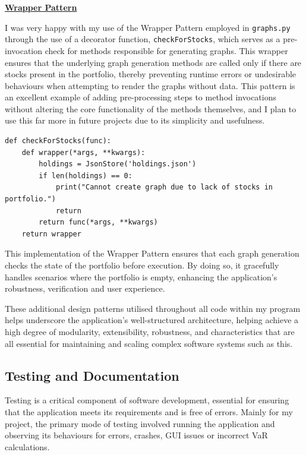 \documentclass{article}
\begin{document}
\underline{\textbf{Wrapper Pattern}}\\\vspace{0.3cm}

I was very happy with my use of the Wrapper Pattern employed in \texttt{graphs.py} through the use of a decorator function, \texttt{checkForStocks}, which serves as a pre-invocation check for methods responsible for generating graphs. This wrapper ensures that the underlying graph generation methods are called only if there are stocks present in the portfolio, thereby preventing runtime errors or undesirable behaviours when attempting to render the graphs without data. This pattern is an excellent example of adding pre-processing steps to method invocations without altering the core functionality of the methods themselves, and I plan to use this far more in future projects due to its simplicity and usefulness.\\\vspace{0.3cm}

\begin{verbatim}
def checkForStocks(func):
    def wrapper(*args, **kwargs):
        holdings = JsonStore('holdings.json')
        if len(holdings) == 0:
            print("Cannot create graph due to lack of stocks in portfolio.")
            return
        return func(*args, **kwargs)
    return wrapper
\end{verbatim}

\vspace{0.3cm}
This implementation of the Wrapper Pattern ensures that each graph generation checks the state of the portfolio before execution. By doing so, it gracefully handles scenarios where the portfolio is empty, enhancing the application's robustness, verification and user experience.\\\vspace{0.3cm}

These additional design patterns utilised throughout all code within my program helps underscore the application's well-structured architecture, helping achieve a high degree of modularity, extensibility, robustness, and characteristics that are all essential for maintaining and scaling complex software systems such as this.

\subsection{Testing and Documentation}

Testing is a critical component of software development, essential for ensuring that the application meets its requirements and is free of errors. Mainly for my project, the primary mode of testing involved running the application and observing its behaviours for errors, crashes, GUI issues or incorrect VaR calculations.\\\vspace{0.3cm}
\end{document}
